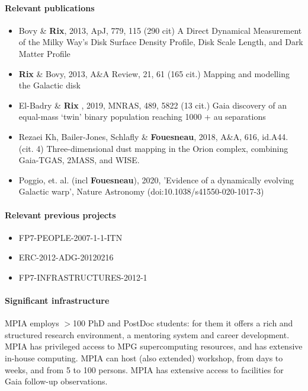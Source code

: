 \paragraph{Relevant publications}
\begin{itemize}
    \item Bovy \& \textbf{Rix}, 2013, ApJ, 779, 115 (290 cit) A Direct Dynamical Measurement of the Milky Way's Disk Surface Density Profile, Disk Scale Length, and Dark Matter Profile 
    \item \textbf{Rix} \& Bovy, 2013, A\&A Review, 21, 61 (165 cit.) Mapping and modelling the Galactic disk
    \item El-Badry \& \textbf{Rix} , 2019, MNRAS, 489, 5822 (13 cit.) Gaia discovery of an equal-mass `twin' binary population reaching 1000 + au separations
    \item {Rezaei Kh, Bailer-Jones, Schlafly \& \textbf{Fouesneau}}, 2018, A\&A, 616, id.A44. (cit. 4) Three-dimensional dust mapping in the Orion complex, combining Gaia-TGAS, 2MASS, and WISE.
    \item Poggio, et. al. (incl \textbf{Fouesneau}), 2020, 'Evidence of a dynamically evolving Galactic warp', Nature Astronomy (doi:10.1038/s41550-020-1017-3)
\end{itemize}

\paragraph{Relevant previous projects}
\begin{itemize}
    \item FP7-PEOPLE-2007-1-1-ITN
    \item ERC-2012-ADG-20120216
    \item FP7-INFRASTRUCTURES-2012-1
\end{itemize}

\paragraph{Significant infrastructure}
MPIA employs $>$100 PhD and PostDoc students: for them it offers a rich and structured research environment, a mentoring system and career development. MPIA has privileged access to MPG supercomputing resources, and has extensive in-house computing. MPIA can host (also extended) workshop, from days to weeks, and from 5 to 100 persons. MPIA has extensive access to facilities for Gaia follow-up observations.